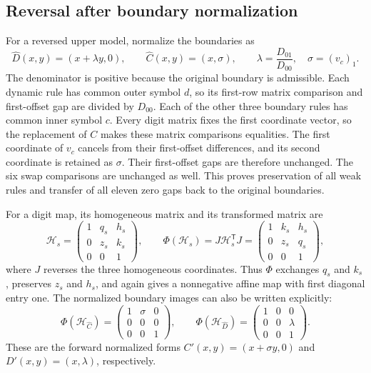\documentclass[11pt,a4paper]{article}
\begin{document}
\subsection{Reversal after boundary normalization}
For a reversed upper model, normalize the boundaries as
\begin{equation}\label{eq:reversed-upper-normal}
\widehat D(x,y)=(x+\lambda y,0),\qquad
\widehat C(x,y)=(x,\sigma),\qquad
\lambda=\frac{D_{01}}{D_{00}},\quad \sigma=(v_c)_1.
\end{equation}
The denominator is positive because the original boundary is
admissible. Each dynamic rule has common outer symbol $d$, so its
first-row matrix comparison and first-offset gap are divided by
$D_{00}$. Each of the other three boundary rules has common inner
symbol $c$. Every digit matrix fixes the first coordinate vector, so
the replacement of $C$ makes these matrix comparisons equalities.
The first coordinate of $v_c$ cancels from their first-offset
differences, and its second coordinate is retained as $\sigma$.
Their first-offset gaps are therefore unchanged. The six swap
comparisons are unchanged as well. This proves preservation of all
weak rules and transfer of all eleven zero gaps back to the original
boundaries.

For a digit map, its homogeneous matrix and its transformed matrix are
\begin{equation}\label{eq:upper-reversal-matrices}
\mathcal H_s=
\begin{pmatrix}1&q_s&h_s\\0&z_s&k_s\\0&0&1\end{pmatrix},
\qquad
\Phi(\mathcal H_s)=J\mathcal H_s^{\mathsf T}J=
\begin{pmatrix}1&k_s&h_s\\0&z_s&q_s\\0&0&1\end{pmatrix},
\end{equation}
where $J$ reverses the three homogeneous coordinates. Thus $\Phi$
exchanges $q_s$ and $k_s$, preserves $z_s$ and $h_s$, and again gives a
nonnegative affine map with first diagonal entry one. The normalized
boundary images can also be written explicitly:
\[
\Phi(\mathcal H_{\widehat C})
 =\begin{pmatrix}1&\sigma&0\\0&0&0\\0&0&1\end{pmatrix},
\qquad
\Phi(\mathcal H_{\widehat D})
 =\begin{pmatrix}1&0&0\\0&0&\lambda\\0&0&1\end{pmatrix}.
\]
These are the forward normalized forms $C'(x,y)=(x+\sigma y,0)$ and
$D'(x,y)=(x,\lambda)$, respectively.
\end{document}

